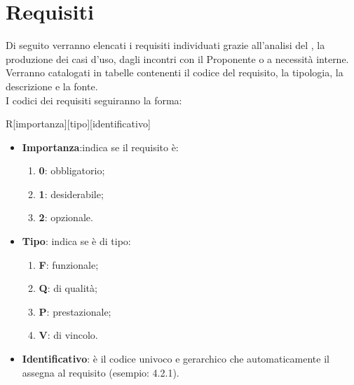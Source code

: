 \section{Requisiti}
\label{sec:Requisiti}
Di seguito verranno elencati i requisiti individuati grazie all'analisi del , la produzione dei casi d'uso, dagli incontri con il Proponente o a necessità interne. Verranno catalogati in tabelle contenenti il codice del requisito, la tipologia, la descrizione e la fonte.\\
I codici dei requisiti seguiranno la forma:
\begin{center}
	R[importanza][tipo][identificativo]
\end{center}
\begin{itemize}
	\item \textbf{Importanza}:indica se il requisito è:
	\begin{enumerate}
		\item \textbf{0}: obbligatorio;
		\item \textbf{1}: desiderabile;
		\item \textbf{2}: opzionale.
	\end{enumerate}
	\item \textbf{Tipo}: indica se è di tipo:
	\begin{enumerate}
		\item \textbf{F}: funzionale;
		\item \textbf{Q}: di qualità;
		\item \textbf{P}: prestazionale;
		\item \textbf{V}: di vincolo.
	\end{enumerate}
	\item \textbf{Identificativo}: è il codice univoco e gerarchico che automaticamente il  assegna al requisito (esempio: 4.2.1).
\end{itemize}
